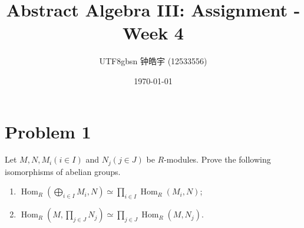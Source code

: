 \documentclass[12pt, a4paper]{article}
\title{Abstract Algebra III: Assignment - Week 4}
\author{
    \begin{CJK*}{UTF8}{gbsn}
    钟皓宇 (12533556)
    \end{CJK*}
}
\date{\today}
\theoremstyle{remark}
\begin{document}
\maketitle
\section*{Problem 1}
Let $M, N, M_i (i \in I)$ and $N_j (j \in J)$ be $R$-modules. Prove the following isomorphisms of abelian groups.
\begin{enumerate}
    \item[(1)] $\operatorname{Hom}_R\left(\bigoplus_{i\in I} M_i, N\right) \simeq \prod_{i\in I} \operatorname{Hom}_R(M_i, N)$;
    \item[(2)] $\operatorname{Hom}_R\left(M, \prod_{j\in J} N_j\right) \simeq \prod_{j\in J} \operatorname{Hom}_R(M, N_j)$.
\end{enumerate}
\end{document}
